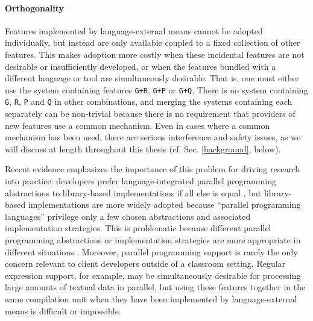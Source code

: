 \paragraph{Orthogonality} Features implemented by language-external means cannot be adopted individually, but instead are only available coupled to a fixed collection of other features. This makes adoption more costly when these incidental features are  not desirable or insufficiently developed, or when the features bundled with a different language or tool are simultaneously desirable. That is, one must either use the system containing features \texttt{G+R}, \texttt{G+P} or \texttt{G+Q}. There is no system containing \texttt{G}, \texttt{R}, \texttt{P} and \texttt{Q} in other combinations, and merging the systems containing each separately can be non-trivial because there is no requirement that providers of new features use a common mechanism. Even in cases where a common mechanism has been used, there are serious interference and safety issues, as we will discuss at length throughout this thesis (cf. Sec. \ref{background}, below).

Recent evidence emphasizes the importance of this problem for driving research into practice: developers prefer language-integrated parallel programming abstractions to library-based implementations if all else is equal \cite{cave2010comparing}, but library-based implementations are more widely adopted because ``parallel programming languages'' privilege only a few chosen  abstractions and associated implementation strategies. This is problematic because different parallel programming abstractions or implementation strategies are more appropriate in different situations \cite{Tasharofi:2013rc}. Moreover,  parallel programming support is rarely the only concern relevant to client developers outside of a classroom setting. Regular expression support, for example, may be simultaneously desirable for processing large amounts of textual data in parallel, but using these features together in the same compilation unit when they have been implemented by language-external means is difficult or impossible.  %



